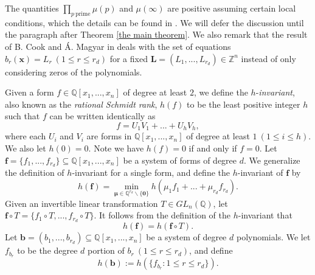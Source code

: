 \documentclass[12pt]{amsart}
\theoremstyle{definition}
\theoremstyle{remark}
\numberwithin{equation}{section}
\begin{document}
The quantities $\prod_{p \ \text{prime}} \mu(p )$ and $\mu(\infty)$ are positive assuming certain local conditions, which the details can be found in \cite[pp. 704]{CM}. We will defer the discussion until the paragraph after Theorem \ref{the main theorem}. We also remark that the result of B. Cook and \'{A}. Magyar in \cite{CM} deals with the set of equations $b_r(\mathbf{x}) = L_r \ (1 \leq r \leq r_d)$ for a fixed $\mathbf{L} = (L_1, ..., L_{r_d}) \in \mathbb{Z}^n$
instead of only considering zeros of the polynomials.

Given a form $f \in \mathbb{Q}[x_1, ..., x_n]$ of degree at least $2$, we define the $h$-\textit{invariant},
also known as the \textit{rational Schmidt rank}, $h(f)$ to be the
least positive integer $h$ such that $f$ can be written identically as
\begin{equation}
\label{defn of hinv}
f = U_1 V_1 + ... + U_h V_h,
\end{equation}
where each $U_i$ and $V_i$ are forms in $\mathbb{Q}[x_1, ..., x_n]$ of degree at least $1 \ (1 \leq i \leq h)$.
We also let $h(0) = 0$. Note we have $h(f) = 0$ if and only if $f = 0$.
Let $\mathbf{f} = \{f_1, ..., f_{r_d}  \} \subseteq \mathbb{Q}[x_1, ..., x_n]$ be a system of forms of degree $d$. We generalize the
definition of $h$-invariant for a single form, and
define the $h$-invariant of $\mathbf{f}$ by
\begin{equation}
h(\mathbf{f}) = \min_{\boldsymbol{\mu} \in \mathbb{Q}^{r_d} \backslash \{ \boldsymbol{0} \}}  h( \mu_{1} f_1 + ... + \mu_{r_d} f_{r_d} ).
\end{equation}
Given an invertible linear transformation $T \in GL_n(\mathbb{Q})$, let $\mathbf{f} \circ T = \{f_1 \circ T, ..., f_{r_d} \circ T \}$.
It follows from the definition of the $h$-invariant that
$$
h(\mathbf{f}) = h(\mathbf{f} \circ T).
$$
Let $\mathbf{b} = ( b_1, ..., b_{r_d} ) \subseteq \mathbb{Q}[x_1,..., x_n]$ be a system of degree $d$ polynomials.
We let $f_{b_r}$ to be the degree $d$ portion of $b_r \ (1 \leq r \leq r_d)$, and define
\begin{equation}
h(\mathbf{b}) := h(\{ f_{b_r} : 1 \leq r \leq r_d  \}).
\end{equation}
\end{document}
